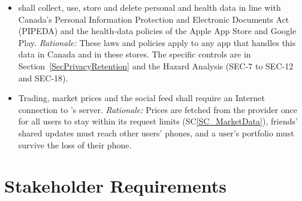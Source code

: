 \documentclass[12pt]{article}
\newcounter{srnum} %
\newcounter{scnum} %
\newcommand{\scref}[1]{SC\ref{#1}}
\begin{document}
\begin{itemize}
\item[SC\refstepcounter{scnum}\thescnum \label{SC_Privacy}:] \progname{} shall
collect, use, store and delete personal and health data in line with
Canada's Personal Information Protection and Electronic Documents Act (PIPEDA)
and the health-data policies of the Apple App Store and Google Play.
\textit{Rationale:} These laws and policies apply to any app that handles this
data in Canada and in these stores. The specific controls are in
Section~\ref{SecPrivacyRetention} and the Hazard Analysis (SEC-7 to SEC-12 and
SEC-18).

\item[SC\refstepcounter{scnum}\thescnum \label{SC_Server}:] Trading, market
prices and the social feed shall require an Internet connection to
\progname{}'s server.
\textit{Rationale:} Prices are fetched from the provider once for all users to
stay within its request limits (\scref{SC_MarketData}), friends' shared updates
must reach other users' phones, and a user's portfolio must survive the loss of
their phone.

\end{itemize}




\section{Stakeholder Requirements}







\end{document}
